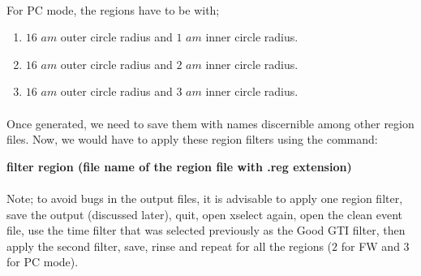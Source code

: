 \documentclass[a4paper,twoside]{report}
\numberwithin{equation}{section}
\begin{document}
\paragraph{}
For PC mode, the regions have to be with;
\begin{enumerate}
\item $16$ $am$ outer circle radius and $1$ $am$ inner circle radius.
\item $16$ $am$ outer circle radius and $2$ $am$ inner circle radius.
\item $16$ $am$ outer circle radius and $3$ $am$ inner circle radius.
\end{enumerate}
\paragraph{}
Once generated, we need to save them with names discernible among other region files. Now, we would have to apply these region filters using the command:
\begin{center}
\item \large \textbf{filter region (file name of the region file with .reg extension)}
\end{center}
\paragraph{}
Note; to avoid bugs in the output files, it is advisable to apply one region filter, save the output (discussed later), quit, open xselect again, open the clean event file, use the time filter that was selected previously as the Good GTI filter, then apply the second filter, save, rinse and repeat for all the regions ($2$ for FW and $3$ for PC mode). 
\end{document}
